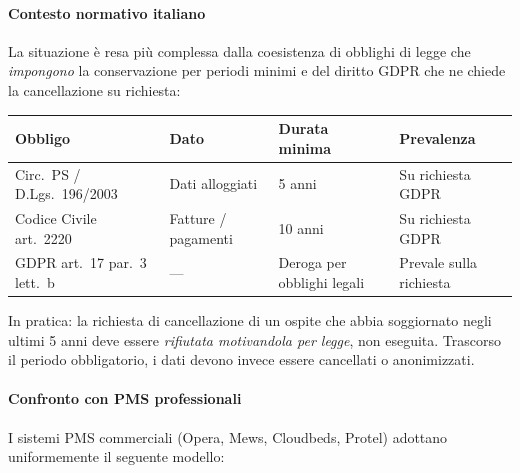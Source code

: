 ﻿\documentclass[a4paper,12pt]{report}
\begin{document}
\paragraph{Contesto normativo italiano}
La situazione è resa più complessa dalla coesistenza di obblighi di legge
che \emph{impongono} la conservazione per periodi minimi e del diritto GDPR
che ne chiede la cancellazione su richiesta:

\begin{center}
\small
\begin{tabularx}{\textwidth}{X l l l}
\toprule
\textbf{Obbligo} & \textbf{Dato} & \textbf{Durata minima} & \textbf{Prevalenza} \\
\midrule
Circ.\ PS / D.Lgs.\ 196/2003 & Dati alloggiati & 5 anni & Su richiesta GDPR \\
Codice Civile art.\ 2220 & Fatture / pagamenti & 10 anni & Su richiesta GDPR \\
GDPR art.\ 17 par.\ 3 lett.\ b & — & Deroga per obblighi legali & Prevale sulla richiesta \\
\bottomrule
\end{tabularx}
\end{center}

\noindent
In pratica: la richiesta di cancellazione di un ospite che abbia soggiornato
negli ultimi 5 anni deve essere \emph{rifiutata motivandola per legge}, non
eseguita. Trascorso il periodo obbligatorio, i dati devono invece essere
cancellati o anonimizzati.

\paragraph{Confronto con PMS professionali}
I sistemi PMS commerciali (Opera, Mews, Cloudbeds, Protel) adottano
uniformemente il seguente modello:
\end{document}

